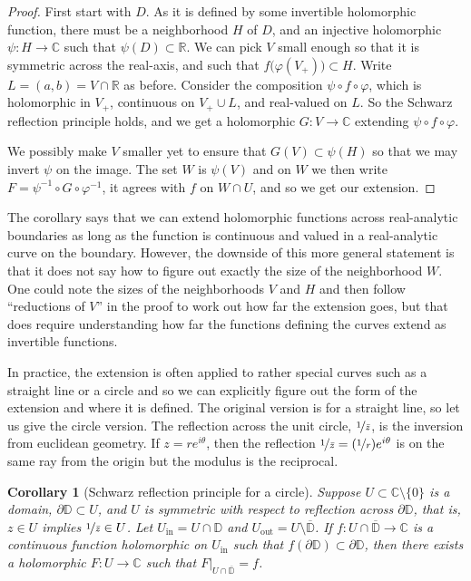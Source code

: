 \documentclass[12pt,openany]{book}
\newcommand{\C}{{\mathbb{C}}}
\newcommand{\R}{{\mathbb{R}}}
\newcommand{\D}{{\mathbb{D}}}
\newcommand{\myquote}[1]{``#1''}
\theoremstyle{plain}
\newtheorem{cor}[thm]{Corollary}
\theoremstyle{remark}
\theoremstyle{definition}
\theoremstyle{exercise}
\theoremstyle{example}
\begin{document}
\begin{proof}
First start with $D$.  As it is defined by some invertible holomorphic
function,
there must be a neighborhood $H$ of $D$, and an injective
holomorphic $\psi \colon H \to \C$ such that $\psi(D) \subset \R$.
We can pick $V$ small enough so that it is symmetric across the real-axis,
and such that $f\bigl(\varphi(V_+)\bigr) \subset H$.
Write $L = (a,b) = V \cap \R$ as before.
Consider the composition $\psi \circ f \circ \varphi$, which is
holomorphic in $V_+$, continuous on $V_+ \cup L$, and
real-valued on $L$.  So the Schwarz reflection principle holds,
and we get a holomorphic $G \colon V \to \C$ extending
$\psi \circ f \circ \varphi$.

We possibly make $V$ smaller yet to ensure that $G(V) \subset \psi(H)$ so that
we may invert $\psi$ on the image.
The set $W$ is $\psi(V)$ and on $W$
we then write $F = \psi^{-1} \circ G \circ \varphi^{-1}$, it agrees with
$f$ on $W \cap U$, and so we get our extension.
\end{proof}

The corollary says that we can extend holomorphic functions across
real-analytic boundaries as long as the function is continuous and valued in
a real-analytic curve on the boundary.  However, the downside of this more
general statement is that it
does not say how to figure out exactly the size of the neighborhood $W$.
One could note the sizes of the neighborhoods $V$ and $H$
and then follow \myquote{reductions of $V$} in the proof to work out how far
the extension goes, but that does require understanding how far the
functions defining the curves extend as invertible functions.

In practice, the extension is often applied to rather special curves such as
a straight line or a circle and so we can
explicitly figure out the form of the extension and where it is defined.
The original version is for a
straight line, so let us give the circle version.
The reflection across the unit circle, $\nicefrac{1}{\bar{z}}$, is the inversion from
euclidean geometry.
If $z = re^{i\theta}$, then the reflection
$\nicefrac{1}{\bar{z}} = (\nicefrac{1}{r}) e^{i\theta}$ is on the same ray from
the origin but the modulus is the reciprocal.

\begin{cor}[Schwarz reflection principle for a circle]
\label{thm:schwarzreflectioncircleholo}
Suppose $U \subset \C \setminus \{ 0 \}$ is a domain, $\partial \D \subset U$,
and $U$ is symmetric with respect to reflection across $\partial \D$,
that is, $z \in U$ implies $\nicefrac{1}{\bar{z}} \in U$.
Let $U_{\text{in}} = U \cap \D$ and $U_{\text{out}} = U \setminus \overline{\D}$.
If $f \colon U \cap \overline{\D} \to \C$ is a continuous
function holomorphic on $U_{\text{in}}$ such that $f(\partial \D) \subset \partial
\D$, then there exists a holomorphic $F \colon U \to \C$ such that
$F|_{U \cap \overline{\D}} = f$.
\end{cor}
\end{document}
